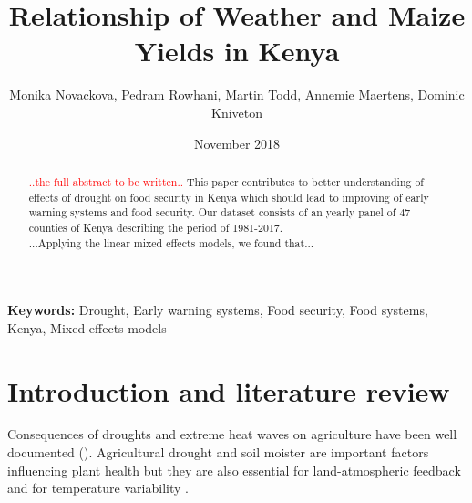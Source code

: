 \documentclass[a4paper,12pt]{article}
\date{\normalsize{November 2018}}
\title{\Large \bf Relationship of Weather and Maize Yields in Kenya}
\author{Monika Novackova, Pedram Rowhani, Martin Todd, Annemie Maertens, Dominic Kniveton}
\affil{\small{Department of Geography, University of Sussex, Falmer, UK}}
\begin{document}
  

\makeatletter
\def\hlinewd#1{%
\noalign{\ifnum0=`}\fi\hrule \@height #1 %
\futurelet\reserved@a\@xhline}
\makeatother

\maketitle
\vfill

\doublespacing

\begin{abstract}
\noindent \textcolor{red}{..the full abstract to be written..} This paper contributes to better understanding of effects of drought on food security in Kenya which should lead to improving of early warning systems and food security. Our dataset consists of an yearly panel of $47$ counties of Kenya describing the period of 1981-2017.
\\
...Applying the linear mixed effects models, we found that...
\end{abstract}



\noindent \textbf{Keywords:}  Drought, Early warning systems, Food security, Food systems, Kenya, Mixed effects models\\




\newpage
\sloppy


\section{Introduction and literature review}\label{Introduction}


Consequences of droughts and extreme heat waves on agriculture have been well documented (\citealp{Deschenes2007Ric,RicardianBello,Lesk2016,Mehrabi2017, schwalm2017}). Agricultural drought and soil moister are important factors influencing plant health but they are also essential for land-atmospheric feedback and for temperature variability \citep{nicolai2017}.
\end{document}
